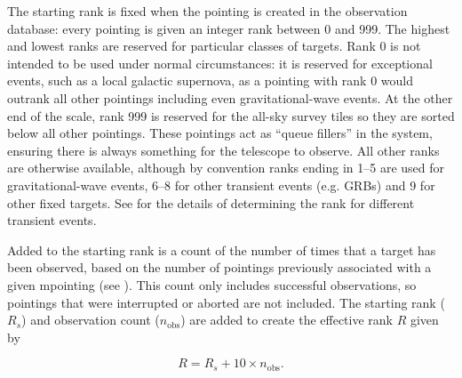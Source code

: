 \begin{colsection}
\begin{colsection}
The starting rank is fixed when the pointing is created in the observation database: every pointing is given an integer rank between 0 and 999. The highest and lowest ranks are reserved for particular classes of targets. Rank 0 is not intended to be used under normal circumstances: it is reserved for exceptional events, such as a local galactic supernova, as a pointing with rank 0 would outrank all other pointings including even gravitational-wave events. At the other end of the scale, rank 999 is reserved for the all-sky survey tiles so they are sorted below all other pointings. These pointings act as ``queue fillers'' in the system, ensuring there is always something for the telescope to observe. All other ranks are otherwise available, although by convention ranks ending in 1--5 are used for gravitational-wave events, 6--8 for other transient events (e.g. GRBs) and 9 for other fixed targets. See  for the details of determining the rank for different transient events.

Added to the starting rank is a count of the number of times that a target has been observed, based on the number of pointings previously associated with a given mpointing (see ). This count only includes successful observations, so pointings that were interrupted or aborted are not included. The starting rank ($R_s$) and observation count ($n_\text{obs}$) are added to create the effective rank $R$ given by

\begin{equation}
    R = R_s + 10\times n_\text{obs}.
    \label{eq:effective_rank}
\end{equation}


\end{colsection}
\end{colsection}
